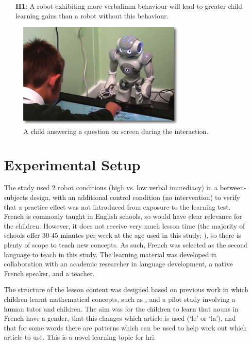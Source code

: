 \begin{enumerate}
\setlength\itemsep{0.05em}
	\item[\textbf{H1}:] A robot exhibiting more \gls{verbalimm} behaviour will lead to greater child learning gains than a robot without this behaviour.
\end{enumerate}

\begin{figure}[t!]
    \centering
    \includegraphics[width=0.75\textwidth]{images/ch9_Snapshot.pdf}
    \caption{A child answering a question on screen during the interaction.}
    \label{fig:snapshot}
\end{figure}

\section{Experimental Setup} \label{sec:verbal-setup}
The study used 2 robot conditions (high vs. low verbal immediacy) in a between-subjects design, with an additional control condition (no intervention) to verify that a practice effect was not introduced from exposure to the learning test. French is commonly taught in English schools, so would have clear relevance for the children. However, it does not receive very much lesson time (the majority of schools offer 30-45 minutes per week at the age used in this study; \citealp{board2015language}), so there is plenty of scope to teach new concepts. As such, French was selected as the second language to teach in this study. The learning material was developed in collaboration with an academic researcher in language development, a native French speaker, and a teacher.

The structure of the lesson content was designed based on previous work in which children learnt mathematical concepts, such as \cite{kennedy2015robot}, and a pilot study involving a human tutor and children. The aim was for the children to learn that nouns in French have a gender, that this changes which article is used (`le' or `la'), and that for some words there are patterns which can be used to help work out which article to use. This is a novel learning topic for \acrshort{hri}.

